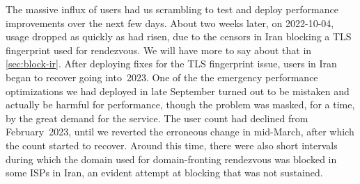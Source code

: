 \documentclass[letterpaper,twocolumn]{article}
\begin{document}
The massive influx of users had us scrambling to test and deploy
performance improvements over the next few days.
About two weeks later, on \mbox{2022-10-04},
usage dropped as quickly as had risen,
due to the censors in Iran blocking a TLS fingerprint
used for rendezvous.
We will have more to say about that in \autoref{sec:block-ir}.
After deploying fixes for the TLS fingerprint issue,
users in Iran began to recover going into~2023.
One of the the emergency performance optimizations we had deployed in late September
turned out to be mistaken and actually be harmful for performance,
though the problem was masked, for a time, by the great demand for the service.
The user count had declined from February~2023,
until we reverted the erroneous change in mid-March,
after which the count started to recover.
Around this time, there were also short intervals during which
the domain used for domain-fronting rendezvous
was blocked in some ISPs in Iran,
an evident attempt at blocking that was not sustained.
\end{document}
